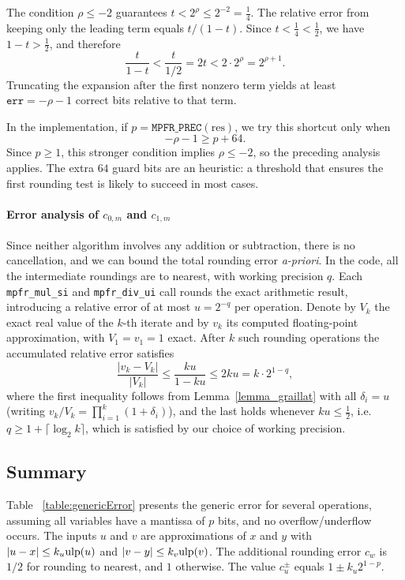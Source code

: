 \documentclass[12pt]{amsart}
\def\ulp{{\rm ulp}}
\begin{document}
The condition $\rho \le -2$ guarantees
$t < 2^\rho \le 2^{-2} = \tfrac{1}{4}$.
The relative error from keeping only the leading term equals $t/(1-t)$.
Since $t < \tfrac{1}{4} < \tfrac{1}{2}$, we have $1 - t > \tfrac{1}{2}$,
and therefore
\[
  \frac{t}{1-t} < \frac{t}{1/2} = 2t < 2 \cdot 2^\rho = 2^{\rho+1}.
\]
Truncating the expansion after the first nonzero term yields at least
$\mathtt{err} = -\rho - 1$ correct bits relative to that term.

In the implementation, if $p = \texttt{MPFR\_PREC}(\mathrm{res})$, we try this
shortcut only when
\[
  -\rho - 1 \ge p + 64.
\]
Since $p \ge 1$, this stronger condition implies $\rho \le -2$, so the
preceding analysis applies. The extra $64$ guard bits are an heuristic:
a threshold that ensures the first rounding test is likely to succeed
in most cases.

\paragraph{\textbf{Error analysis of $c_{0,m}$ and $c_{1,m}$}}

Since neither algorithm involves any addition or subtraction, there is no
cancellation, and we can bound the total rounding error \textit{a-priori}.
In the code, all the intermediate roundings are to nearest, with working
precision $q$. Each \texttt{mpfr\_mul\_si} and \texttt{mpfr\_div\_ui} call
rounds the exact arithmetic result, introducing a relative error of at most
$u = 2^{-q}$ per operation. Denote by $V_k$ the exact real value of the
$k$-th iterate and by $v_k$ its computed floating-point approximation, with
$V_1 = v_1 = 1$ exact. After $k$ such rounding operations the accumulated
relative error satisfies
\[
  \frac{|v_k - V_k|}{|V_k|}
  \le \frac{ku}{1-ku}
  \le 2ku = k \cdot 2^{1-q},
\]
where the first inequality follows from Lemma~\ref{lemma_graillat} with all
$\delta_i = u$ (writing $v_k/V_k = \prod_{i=1}^k(1+\delta_i)$), and the last
holds whenever $ku \le \tfrac{1}{2}$, i.e. $q \ge 1 + \lceil\log_2 k\rceil$,
which is satisfied by our choice of working precision.

\subsection{Summary}

Table ~\ref{table:genericError} presents the generic error for several operations, assuming all variables have a
mantissa of $p$ bits, and no overflow/underflow occurs.
The inputs $u$ and $v$ are
approximations of $x$ and $y$ with $|u-x| \le k_u \ulp(u)$ and
$|v-y| \le k_v \ulp(v)$. The additional rounding error $c_w$ is $1/2$ for
rounding to nearest, and $1$ otherwise.
The value $c^{\pm}_u$ equals $1 \pm k_u 2^{1-p}$.
\end{document}
